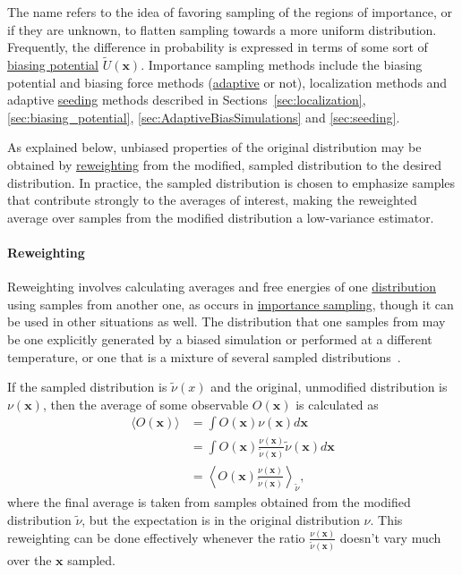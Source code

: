 \documentclass[9pt,review]{livecoms}
\newcommand{\vx}{\mathbf{x}}
\begin{document}

The name refers to the idea of favoring sampling of the regions of importance, or if they are unknown, to flatten sampling towards a more uniform distribution. Frequently, the difference in probability is expressed in terms of some sort of \hyperlink{ref:biasingE} {biasing potential} $\tilde U(\vx)$. Importance sampling methods include the biasing potential and biasing force methods (\hyperlink{ref:Adaptive} {adaptive} or not), localization methods and adaptive \hyperlink{ref:Seeding} {seeding} methods described in Sections~\ref{sec:localization}, \ref{sec:biasing_potential}, \ref{sec:AdaptiveBiasSimulations} and \ref{sec:seeding}.

As explained below, unbiased properties of the original distribution may be obtained by \hyperlink{ref:Reweighting} {reweighting} from the modified, sampled distribution to the desired distribution.
In practice, the  sampled distribution is chosen to emphasize samples that contribute strongly to the averages of interest, making the reweighted average over samples from the modified distribution a low-variance estimator.


\hypertarget{ref:Reweighting} {\paragraph{Reweighting}}
Reweighting involves calculating averages and free energies of one \hyperlink{ref:Distribution} {distribution} using samples from another one, as occurs in \hyperlink{ref:IS} {importance sampling}, though it can be used in other situations as well. The distribution that one samples from  may be one explicitly generated by a biased simulation or performed at a different temperature, or one that is a mixture of several sampled distributions~\cite{reweighting_mixture_distribution}.

If the sampled distribution is $\tilde \nu(x)$ and the original, unmodified distribution is $\nu(\vx)$, then the average of some observable $O(\vx)$ is calculated as
\begin{align}
\langle O(\vx) \rangle &= \int  O(\vx) \nu(\vx) d\vx \nonumber \\
&= \int O(\vx) \frac{\nu(\vx)}{\tilde \nu(\vx)} \tilde \nu(\vx) d\vx\nonumber \\
&= \left \langle O(\vx)  \frac{\nu(\vx)}{\tilde{\nu}(\vx)} \right \rangle_{\tilde \nu},
\end{align}
where the final average is taken from samples obtained from the modified distribution $\tilde \nu$, but the expectation is in the original distribution $\nu$.  This reweighting can be done effectively whenever the ratio $\frac{\nu(\vx)}{\tilde \nu(\vx)}$ doesn't vary much over the $\vx$ sampled.
\end{document}
